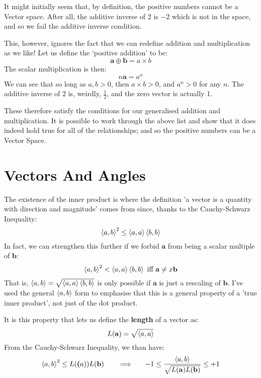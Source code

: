 \documentclass[a4paper,openany,11pt]{book}
\renewcommand\vec[1]{\boldsymbol{\mathbf{#1}}}
\begin{document}
					It might initially seem that, by definition, the positive numbers cannot be a Vector space. After all, the additive inverse of $2$ is $-2$ which is not in the space, and so we fail the additive inverse condition. 

					This, however, ignores the fact that we can redefine addition and multiplication as we like! Let us define the `positive addition' to be:
					$$ \vec{a} \oplus \vec{b} = a\times b $$
					The scalar multiplication is then:
					$$ n \vec{a} = a^n$$
					We can see that so long as $a,b > 0$, then $a\times b > 0$, and $a^n > 0$ for any $n$. The additive inverse of $2$ is, weirdly, $\frac{1}{2}$, and the zero vector is actually 1.
					
					These therefore satisfy the conditions for our generalised addition and multiplication. It is possible to work through the above list and show that it does indeed hold true for all of the relationships; and so the positive numbers can be a Vector Space.   

		\chapter{Vectors And Angles}\label{Int:Angles}

			The existence of the inner product is where the definition 'a vector is a quantity with direction and magnitude' comes from since, thanks to the Cauchy-Schwarz Inequality:
			\begin{equation}
				\left\langle a, b \right\rangle^2 \leq \left\langle a, a \right\rangle \left\langle b, b \right\rangle
			\end{equation}
			In fact, we can strengthen this further if we forbid $\vec{a}$ from being a scalar multiple of $\vec{b}$:
			\begin{equation}
				\inner{a}{b}^2 <  \inner{a}{a} \inner{b}{b} \text{ iff } \vec{a} \neq x \vec{b}
			\end{equation}
			That is, $\left\langle a, b \right\rangle = \sqrt{ \left\langle a, a \right\rangle \left\langle b, b \right\rangle}$ is only possible if $\vec{a}$ is just a rescaling of $\vec{b}$. I've used the general $\left\langle a, b \right\rangle$ form to emphasise that this is a general property of a 'true inner product', not just of the dot product.  

			It is this property that lets us define the \textbf{length} of a vector as:
			\begin{equation}
				L(\vec{a}) = \sqrt{\inner{a}{a}}
			\end{equation}
			From the Cauchy-Schwarz Inequality, we than have:
			\begin{equation}
				\inner{a}{b}^2 \leq L(\vec(a)) L(\vec{b}) ~~~~~~ \Longrightarrow ~~~~~ -1 \leq \frac{\inner{a}{b}}{\sqrt{L(\vec{a}) L(\vec{b})}} \leq +1
			\end{equation}
\end{document}
